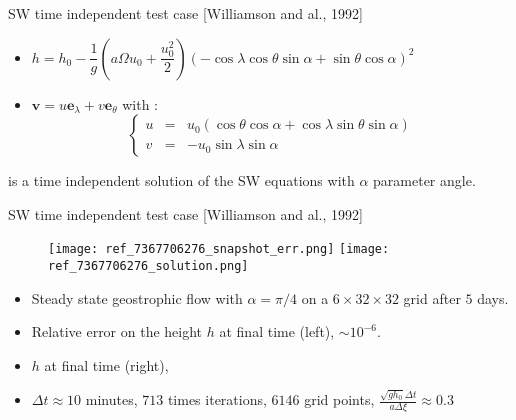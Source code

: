 \documentclass[11pt]{beamer}
\begin{document}

\begin{frame}{SW time independent test case [Williamson and al., 1992]}

\begin{itemize}
\item $h = h_0 - \dfrac{1}{g} \left( a \Omega u_0 + \dfrac{u_0^2}{2} \right)\left( - \cos \lambda \cos \theta \sin \alpha + \sin \theta \cos \alpha \right)^2$
\item $\mathbf{v} = u \mathbf{e}_{\lambda}+ v \mathbf{e}_{\theta}$ with :
\begin{equation*}
\left\lbrace \begin{array}{rcl}
 u & = & u_0 ( \cos \theta \cos \alpha + \cos \lambda \sin \theta \sin \alpha)\\
 v & = & -u_0 \sin \lambda \sin \alpha
 \end{array} \right.
\end{equation*}
\end{itemize}
is a time independent solution of the SW equations with $\alpha$ parameter angle.

\end{frame}


\begin{frame}{SW time independent test case [Williamson and al., 1992]}
\begin{figure}
\texttt{[image: ref\_7367706276\_snapshot\_err.png]}
\texttt{[image: ref\_7367706276\_solution.png]}
\end{figure}
\begin{itemize}
\item Steady state geostrophic flow with $\alpha=\pi/4$ on a $6 \times 32 \times 32$ grid after $5$ days.
\item Relative error on the height $h$ at final time (left), $\sim 10^{-6}$.
\item $h$ at final time (right),
\item $\Delta t \approx 10$ minutes, $713$ times iterations, $6146$ grid points, $\frac{\sqrt{g h_0} \Delta t}{a \Delta \xi } \approx 0.3$
\end{itemize}
\end{frame}
\end{document}

